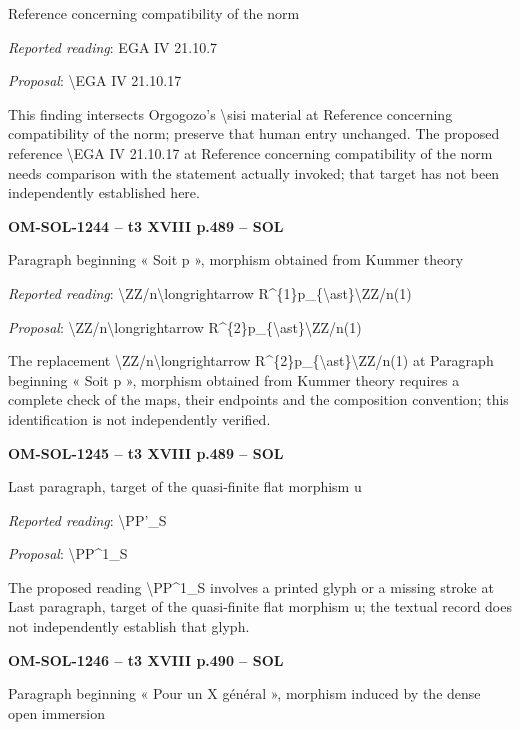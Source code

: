 Reference concerning compatibility of the norm\par
\emph{Reported reading}: EGA IV 21.10.7\par
\emph{Proposal}: \textbackslash{}EGA IV 21.10.17\par
This finding intersects Orgogozo's \textbackslash{}sisi material at Reference concerning compatibility of the norm; preserve that human entry unchanged. The proposed reference \textbackslash{}EGA IV 21.10.17 at Reference concerning compatibility of the norm needs comparison with the statement actually invoked; that target has not been independently established here.\par
\par\noindent\textbf{OM-SOL-1244 -- t3 XVIII p.489 -- SOL}\par
Paragraph beginning « Soit p », morphism obtained from Kummer theory\par
\emph{Reported reading}: \textbackslash{}ZZ/n\textbackslash{}longrightarrow R\textasciicircum{}\{1\}p\_\{\textbackslash{}ast\}\textbackslash{}ZZ/n(1)\par
\emph{Proposal}: \textbackslash{}ZZ/n\textbackslash{}longrightarrow R\textasciicircum{}\{2\}p\_\{\textbackslash{}ast\}\textbackslash{}ZZ/n(1)\par
The replacement \textbackslash{}ZZ/n\textbackslash{}longrightarrow R\textasciicircum{}\{2\}p\_\{\textbackslash{}ast\}\textbackslash{}ZZ/n(1) at Paragraph beginning « Soit p », morphism obtained from Kummer theory requires a complete check of the maps, their endpoints and the composition convention; this identification is not independently verified.\par
\par\noindent\textbf{OM-SOL-1245 -- t3 XVIII p.489 -- SOL}\par
Last paragraph, target of the quasi-finite flat morphism u\par
\emph{Reported reading}: \textbackslash{}PP'\_S\par
\emph{Proposal}: \textbackslash{}PP\textasciicircum{}1\_S\par
The proposed reading \textbackslash{}PP\textasciicircum{}1\_S involves a printed glyph or a missing stroke at Last paragraph, target of the quasi-finite flat morphism u; the textual record does not independently establish that glyph.\par
\par\noindent\textbf{OM-SOL-1246 -- t3 XVIII p.490 -- SOL}\par
Paragraph beginning « Pour un X général », morphism induced by the dense open immersion\par
